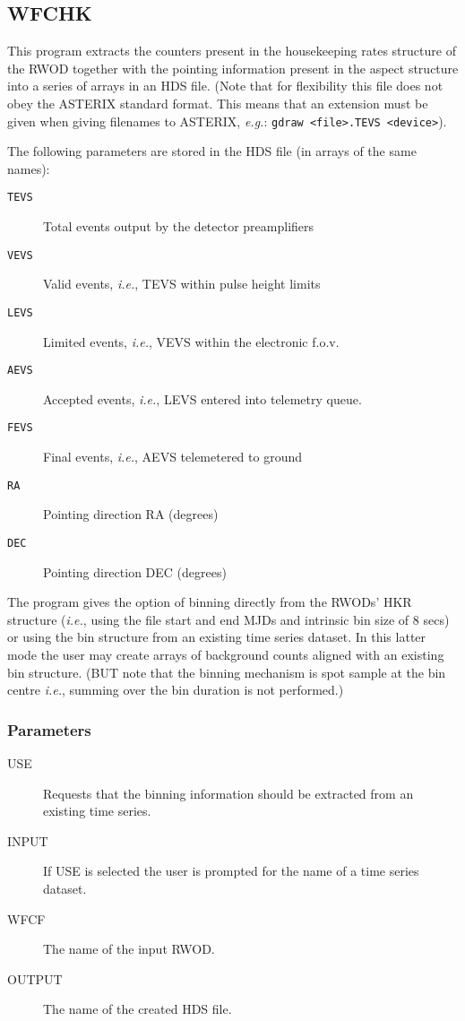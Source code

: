 \subsection{WFCHK}
\label{sec:programs:wfchk}

This program extracts the counters present in the housekeeping rates
structure of the RWOD together with the pointing information present in
the aspect structure into a series of arrays in an HDS file. (Note that
for flexibility this file does not obey the ASTERIX standard format.
This means that an extension must be given when giving filenames to
ASTERIX, {\em e.g.}: {\tt gdraw \verb+<+file\verb+>+.TEVS
\verb+<+device\verb+>+}).

The following parameters are stored in the HDS file (in arrays
of the same names):

\begin{description}
\item [{\tt TEVS}] Total events output by the detector preamplifiers
\item [{\tt VEVS}] Valid events, {\em i.e.}, TEVS within pulse height limits
\item [{\tt LEVS}] Limited events, {\em i.e.}, VEVS within the electronic f.o.v.
\item [{\tt AEVS}] Accepted events, {\em i.e.}, LEVS entered into telemetry queue.
\item [{\tt FEVS}] Final events, {\em i.e.}, AEVS telemetered to ground
\item [{\tt RA}]   Pointing direction RA (degrees)
\item [{\tt DEC}]  Pointing direction DEC (degrees)
\end{description}

The program gives the option of binning directly from the RWODs' HKR
structure ({\em i.e.}, using the file start and end MJDs and intrinsic
bin size of 8 secs) or using the bin structure from an existing time
series dataset.  In this latter mode the user may create arrays of
background counts aligned with an existing bin structure. (BUT note
that the binning mechanism is spot sample at the bin centre {\em i.e.},
summing over the bin duration is not performed.)

\subsubsection{Parameters}

\begin{description}

\item[USE]
Requests that the binning information should be extracted from an
existing time series.

\item[INPUT]
If USE is selected the user is prompted for the name of a time series
dataset.

\item[WFCF]
The name of the input RWOD.

\item[OUTPUT]
The name of the created HDS file.

\end{description}

